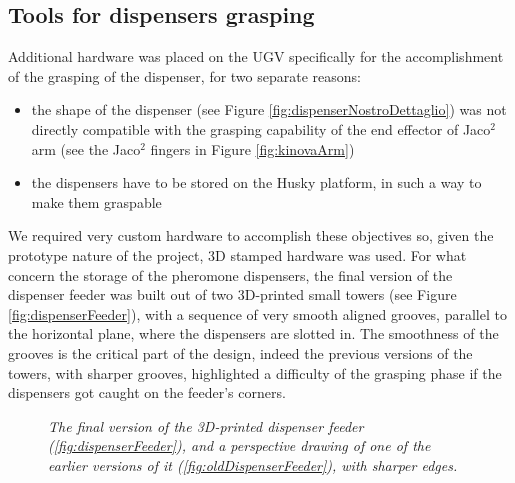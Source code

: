 \subsection{Tools for dispensers grasping}
Additional hardware was placed on the \ac{UGV} specifically for the accomplishment of the grasping of the dispenser, for two separate reasons:

\begin{itemize}
	\item the shape of the dispenser (see Figure \ref{fig:dispenserNostroDettaglio}) was not directly compatible with the grasping capability of the end effector of Jaco$^2$ arm (see the Jaco$^2$ fingers in Figure \ref{fig:kinovaArm})
	\item the dispensers have to be stored on the Husky platform, in such a way to make them graspable
\end{itemize}
We required very custom hardware to accomplish these objectives so, given the prototype nature of the project, 3D stamped hardware was used.
For what concern the storage of the pheromone dispensers, the final version of the dispenser feeder was built out of two 3D-printed small towers (see Figure \ref{fig:dispenserFeeder}), with a sequence of very smooth aligned grooves, parallel to the horizontal plane, where the dispensers are slotted in. The smoothness of the grooves is the critical part of the design, indeed the previous versions of the towers, with sharper grooves, highlighted a difficulty of the grasping phase if the dispensers got caught on the feeder's corners.

\begin{figure}
	\centering
		\qquad
	\caption{\textit{The final version of the 3D-printed dispenser feeder (\ref{fig:dispenserFeeder}), and a 	perspective drawing of one of the earlier versions of it (\ref{fig:oldDispenserFeeder}), with sharper edges.}}
\end{figure}


